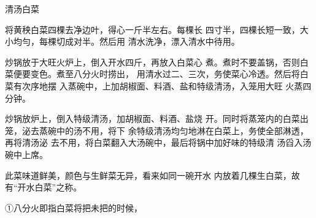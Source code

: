 \begin{recipe}[名开水白菜]{清汤白菜}

\ingredients


\cooking

\step 将黄秧白菜四棵去净边叶，得心一斤半左右。每棵长 四寸半，四棵长短一致，大小均勻，每棵切成对半。然后用 清水洗净，漂入清水中待用。

\step 炒锅放于大旺火炉上，倒入开水四斤，再放入白菜心 煮。煮时不要盖锅，否则白菜便要变色。煮至八分火时捞出， 用清水过二、三次，务使菜心冷透。然后将白菜有次序地摆 入蒸碗中，上加胡椒面、料酒、盐和特级清汤，入笼用大旺 火蒸四分钟。

\step 炒锅放炉上，倒入特级清汤，加胡椒面、料酒、盐烧 开。同时将蒸笼内的白菜出笼，泌去蒸碗中的汤不用，将下 余特级清汤均匀地淋在白菜上，务使全部淋透，再将清汤泌 去不用，将白菜翻入大汤碗中，最后将锅中加好味的特级清 汤舀入汤碗中上席。

\notes

此菜味道鲜美，颜色与生鲜菜无异，看来如同一碗开水 内放着几棵生白菜，故有“开水白菜”之称。

①八分火即指白菜将把未把的时候，

\end{recipe}


